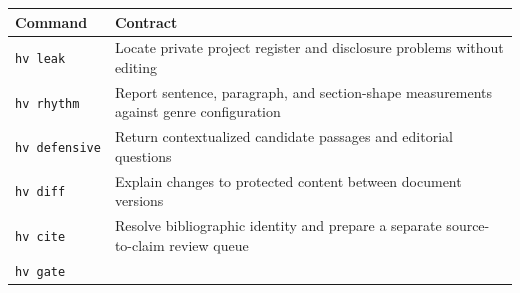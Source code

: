 \documentclass[
  11pt,
  english,
]{article}
\begin{document}
\begin{longtable}[]{@{}ll@{}}
\toprule
\begin{minipage}[b]{0.47\columnwidth}\raggedright
Command\strut
\end{minipage} & \begin{minipage}[b]{0.47\columnwidth}\raggedright
Contract\strut
\end{minipage}\tabularnewline
\midrule
\endhead
\begin{minipage}[t]{0.47\columnwidth}\raggedright
\texttt{hv\ leak}\strut
\end{minipage} & \begin{minipage}[t]{0.47\columnwidth}\raggedright
Locate private project register and disclosure problems without
editing\strut
\end{minipage}\tabularnewline
\begin{minipage}[t]{0.47\columnwidth}\raggedright
\texttt{hv\ rhythm}\strut
\end{minipage} & \begin{minipage}[t]{0.47\columnwidth}\raggedright
Report sentence, paragraph, and section-shape measurements against genre
configuration\strut
\end{minipage}\tabularnewline
\begin{minipage}[t]{0.47\columnwidth}\raggedright
\texttt{hv\ defensive}\strut
\end{minipage} & \begin{minipage}[t]{0.47\columnwidth}\raggedright
Return contextualized candidate passages and editorial questions\strut
\end{minipage}\tabularnewline
\begin{minipage}[t]{0.47\columnwidth}\raggedright
\texttt{hv\ diff}\strut
\end{minipage} & \begin{minipage}[t]{0.47\columnwidth}\raggedright
Explain changes to protected content between document versions\strut
\end{minipage}\tabularnewline
\begin{minipage}[t]{0.47\columnwidth}\raggedright
\texttt{hv\ cite}\strut
\end{minipage} & \begin{minipage}[t]{0.47\columnwidth}\raggedright
Resolve bibliographic identity and prepare a separate source-to-claim
review queue\strut
\end{minipage}\tabularnewline
\begin{minipage}[t]{0.47\columnwidth}\raggedright
\texttt{hv\ gate}\strut

\end{minipage}
\end{longtable}
\end{document}
